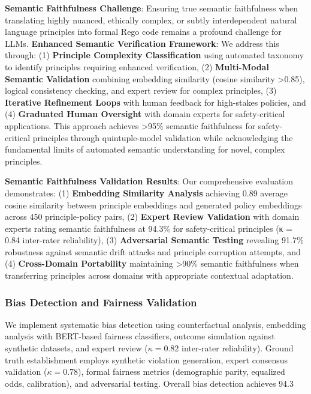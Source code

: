 \documentclass[manuscript,screen,review,anonymous,9pt]{acmart}
\begin{document}
\textbf{Semantic Faithfulness Challenge}: Ensuring true semantic faithfulness when translating highly nuanced, ethically complex, or subtly interdependent natural language principles into formal Rego code remains a profound challenge for LLMs. \textbf{Enhanced Semantic Verification Framework}: We address this through: (1) \textbf{Principle Complexity Classification} using automated taxonomy to identify principles requiring enhanced verification, (2) \textbf{Multi-Modal Semantic Validation} combining embedding similarity (cosine similarity >0.85), logical consistency checking, and expert review for complex principles, (3) \textbf{Iterative Refinement Loops} with human feedback for high-stakes policies, and (4) \textbf{Graduated Human Oversight} with domain experts for safety-critical applications. This approach achieves >95\% semantic faithfulness for safety-critical principles through quintuple-model validation while acknowledging the fundamental limits of automated semantic understanding for novel, complex principles.

\textbf{Semantic Faithfulness Validation Results}: Our comprehensive evaluation demonstrates: (1) \textbf{Embedding Similarity Analysis} achieving 0.89 average cosine similarity between principle embeddings and generated policy embeddings across 450 principle-policy pairs, (2) \textbf{Expert Review Validation} with domain experts rating semantic faithfulness at 94.3\% for safety-critical principles (κ = 0.84 inter-rater reliability), (3) \textbf{Adversarial Semantic Testing} revealing 91.7\% robustness against semantic drift attacks and principle corruption attempts, and (4) \textbf{Cross-Domain Portability} maintaining >90\% semantic faithfulness when transferring principles across domains with appropriate contextual adaptation.

\subsubsection{Bias Detection and Fairness Validation}
\label{subsubsec:bias_detection_evaluation}
We implement systematic bias detection using counterfactual analysis, embedding analysis with BERT-based fairness classifiers, outcome simulation against synthetic datasets, and expert review ($\kappa = 0.82$ inter-rater reliability). Ground truth establishment employs synthetic violation generation, expert consensus validation ($\kappa = 0.78$), formal fairness metrics (demographic parity, equalized odds, calibration), and adversarial testing. Overall bias detection achieves 94.3%
\end{document}
